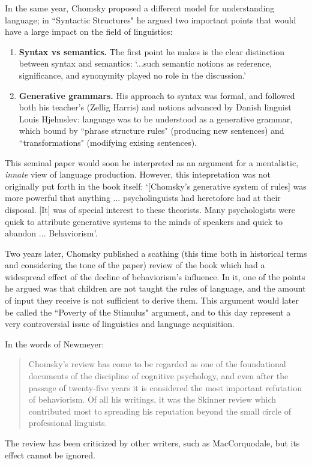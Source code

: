 \documentclass[../main.tex]{subfiles}
\begin{document}
In the same year, Chomsky proposed a different model for understanding language; in ``Syntactic Structures" he argued two important points that would have a large impact on the field of linguistics:
\begin{enumerate}
    \item \textbf{Syntax vs semantics.} The first point he makes is the clear distinction between syntax and semantics: \enquote*{...such semantic notions as reference, significance, and synonymity played no role in the discussion.}
    \item \textbf{Generative grammars.} His approach to syntax was formal, and followed both his teacher's (Zellig Harris) and notions advanced by Danish linguist Louis Hjelmslev: language was to be understood as a generative grammar, which bound by ``phrase structure rules" (producing new sentences) and ``transformations" (modifying exising sentences).
\end{enumerate}
This seminal paper would soon be interpreted as an argument for a mentalistic, \textit{innate} view of language production. However, this intepretation was not originally put forth in the book itself: \enquote*{[Chomsky's generative system of rules] was more powerful that anything ... psycholinguists had heretofore had at their disposal. [It] was of special interest to these theorists. Many psychologists were quick to attribute generative systems to the minds of speakers and quick to abandon ... Behaviorism}\cite{steinbergPsycholinguisticsLanguageMind2013}.

Two years later, Chomsky published a scathing (this time both in historical terms and considering the tone of the paper) review \cite{chomskyReviewBFSkinner2013} of the book which had a widespread effect of the decline of behaviorism's influence. In it, one of the points he argued was that children are not taught the rules of language, and the amount of input they receive is not sufficient to derive them. This argument would later be called the ``Poverty of the Stimulus" argument, and to this day represent a very controversial issue of linguistics and language acquisition.

In the words of Newmeyer\cite{newmeyerPoliticsLinguistics1986}:
\begin{quote}
    Chomsky's review has come to be regarded as one of the foundational documents of the discipline of cognitive psychology, and even after the passage of twenty-five years it is considered the most important refutation of behaviorism. Of all his writings, it was the Skinner review which contributed most to spreading his reputation beyond the small circle of professional linguists.
\end{quote}
The review has been criticized by other writers, such as MacCorquodale\cite{maccorquodaleChomskyReviewSkinner1970}, but its effect cannot be ignored.
\end{document}
